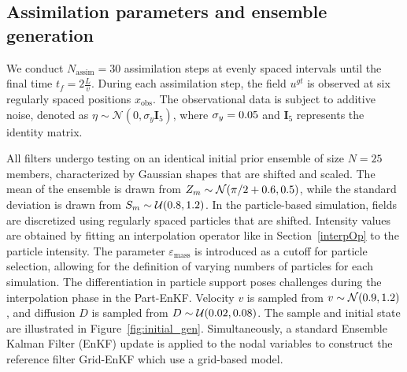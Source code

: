 \subsection{Assimilation parameters and ensemble generation}

We conduct $N_{\text{assim}} = 30$ assimilation steps at evenly spaced intervals until the final time $t_f = 2 \frac{L}{v}$. During each assimilation step, the field $u^{gt}$ is observed at six regularly spaced positions $x_{\text{obs}}$. The observational data is subject to additive noise, denoted as $\eta \sim \mathcal{N}(0, \sigma_y \bm{I}_5)$, where $\sigma_y = 0.05$ and $\bm{I}_5$ represents the identity matrix.

All filters undergo testing on an identical initial prior ensemble of size $N = 25$ members, characterized by Gaussian shapes that are shifted and scaled. The mean of the ensemble is drawn from $Z_m \sim \mathcal{N}(\pi/2 + 0.6, 0.5)$, while the standard deviation is drawn from $S_m \sim \mathcal{U}(0.8, 1.2)$.
In the particle-based simulation, fields are discretized using regularly spaced particles that are shifted. Intensity values are obtained by fitting an interpolation operator like in Section~\ref{interpOp} to the particle intensity.
The parameter $\varepsilon_{\text{mass}}$ is introduced as a cutoff for particle selection, allowing for the definition of varying numbers of particles for each simulation. The differentiation in particle support poses challenges during the interpolation phase in the Part-EnKF.
Velocity $v$ is sampled from $v \sim \mathcal{N}(0.9, 1.2)$, and diffusion $D$ is sampled from $D \sim \mathcal{U}(0.02, 0.08)$. The sample and initial state are illustrated in Figure~\ref{fig:initial_gen}.
Simultaneously, a standard Ensemble Kalman Filter (EnKF) update is applied to the nodal variables to construct the reference filter Grid-EnKF which use a grid-based model.

